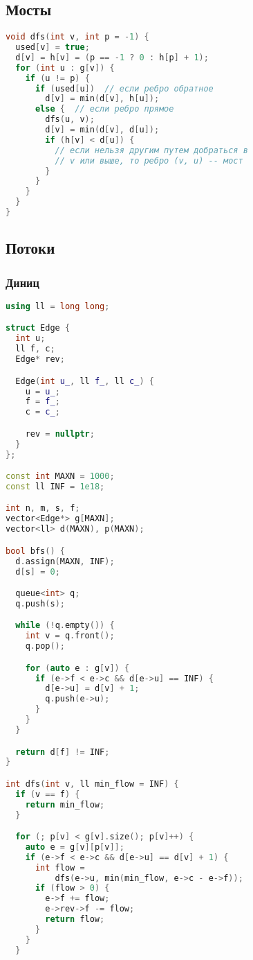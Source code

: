 \documentclass[10pt,a4paper,landscape,twosided]{extarticle}
\begin{document}
\begin{multicols}{3}
\subsection{Мосты}
\begin{lstlisting}[language=C++]
void dfs(int v, int p = -1) {
  used[v] = true;
  d[v] = h[v] = (p == -1 ? 0 : h[p] + 1);
  for (int u : g[v]) {
    if (u != p) {
      if (used[u])  // если ребро обратное
        d[v] = min(d[v], h[u]);
      else {  // если ребро прямое
        dfs(u, v);
        d[v] = min(d[v], d[u]);
        if (h[v] < d[u]) {
          // если нельзя другим путем добраться в
          // v или выше, то ребро (v, u) -- мост
        }
      }
    }
  }
}
\end{lstlisting}

\subsection{Потоки}

\subsubsection{Диниц}
\begin{lstlisting}[language=C++]
using ll = long long;

struct Edge {
  int u;
  ll f, c;
  Edge* rev;

  Edge(int u_, ll f_, ll c_) {
    u = u_;
    f = f_;
    c = c_;

    rev = nullptr;
  }
};

const int MAXN = 1000;
const ll INF = 1e18;

int n, m, s, f;
vector<Edge*> g[MAXN];
vector<ll> d(MAXN), p(MAXN);

bool bfs() {
  d.assign(MAXN, INF);
  d[s] = 0;

  queue<int> q;
  q.push(s);

  while (!q.empty()) {
    int v = q.front();
    q.pop();

    for (auto e : g[v]) {
      if (e->f < e->c && d[e->u] == INF) {
        d[e->u] = d[v] + 1;
        q.push(e->u);
      }
    }
  }

  return d[f] != INF;
}

int dfs(int v, ll min_flow = INF) {
  if (v == f) {
    return min_flow;
  }

  for (; p[v] < g[v].size(); p[v]++) {
    auto e = g[v][p[v]];
    if (e->f < e->c && d[e->u] == d[v] + 1) {
      int flow =
          dfs(e->u, min(min_flow, e->c - e->f));
      if (flow > 0) {
        e->f += flow;
        e->rev->f -= flow;
        return flow;
      }
    }
  }


\end{lstlisting}
\end{multicols}
\end{document}

